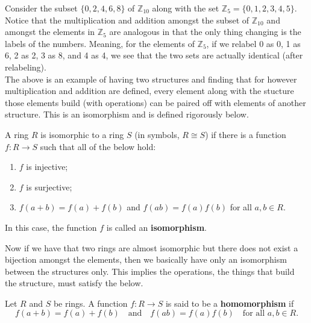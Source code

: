 \documentclass[../main.tex]{subfiles}
\begin{document}
\begin{remark}
Consider the subset $\{0,2,4,6,8\}$ of $\mathbb{Z}_{10}$ along with
the set $\mathbb{Z}_5 = \{0,1,2,3,4,5\}$. Notice that the multiplication 
and addition amongst the subset of $\mathbb{Z}_10$ and amongst the elements in $\mathbb{Z}_5$
are analogous in that the only thing changing is the labels of the numbers. Meaning, 
for the elements of $\mathbb{Z}_5$, if we relabel 0 as 0, 1 as 6, 2 as 2, 3 as 8, and 4 as 4, we see
that the two sets are actually identical (after relabeling).\\
\indent The above is an example of having two structures and finding that for
however multiplication and addition are defined, every element along with the stucture those elements build (with operations)
can be paired off with elements of another structure. This is an isomorphism and is defined rigorously below.
\end{remark}



\begin{definition}[Isomorphism]
A ring $R$ is isomorphic to a ring $S$ (in symbols, $R \cong S$) if there is a function $f: R \to S$ such that all of the below hold:
\begin{enumerate}
    \item $f$ is injective;
    \item $f$ is surjective;
    \item $f(a + b) = f(a) + f(b)$ \quad and \quad $f(ab) = f(a) f(b)$ for all $a, b \in R$.
\end{enumerate}
In this case, the function $f$ is called an \textbf{isomorphism}.
\end{definition}




\begin{remark}
Now if we have that two rings are almost isomorphic but there does not 
exist a bijection amongst the elements, then we basically have only an isomorphism between
the structures only. This implies the operations, the things that build the structure, must satisfy the below.
\end{remark}

\begin{definition}[Homomorphism]
Let $R$ and $S$ be rings. A function $f: R \to S$ is said to be a \textbf{homomorphism} if
\[
f(a + b) = f(a) + f(b) \quad \text{and} \quad f(ab) = f(a) f(b) \quad \text{for all } a, b \in R.
\]
\end{definition}
\end{document}
